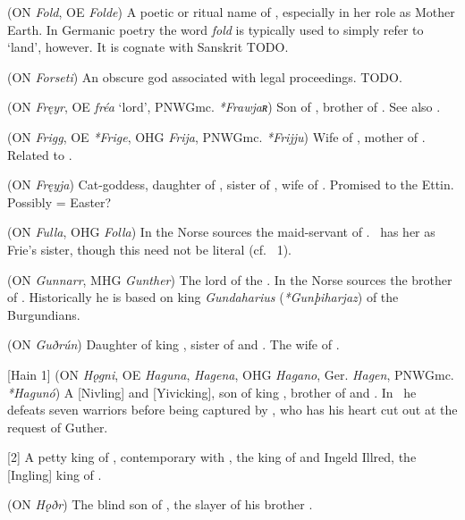 \begin{itemize}
 (ON \emph{Fold}, OE \emph{Folde})
  A poetic or ritual name of , especially in her role as Mother Earth.  In Germanic poetry the word \emph{fold} is typically used to simply refer to ‘land’, however.  It is cognate with Sanskrit TODO.

 (ON \emph{Forseti})
  An obscure god associated with legal proceedings. TODO.

 (ON \emph{Fręyr}, OE \emph{fréa} ‘lord’, PNWGmc. \emph{*Frawjaʀ})
  Son of , brother of . See also .

 (ON \emph{Frigg}, OE \emph{*Frige}, OHG \emph{Frija}, PNWGmc. \emph{*Frijju})
  Wife of , mother of . Related to .

 (ON \emph{Fręyja})
  Cat-goddess, daughter of , sister of , wife of . Promised to the Ettin. Possibly = Easter?

 (ON \emph{Fulla}, OHG \emph{Folla})
  In the Norse sources the maid-servant of .  \MerseburgTwo\ has her as Frie’s sister, though this need not be literal (cf. \Hyndluljod\ 1).

 (ON \emph{Gunnarr}, MHG \emph{Gunther})
  The lord of the .  In the Norse sources the brother of .  Historically he is based on king \emph{Gundaharius} (\emph{*Gunþiharjaz}) of the Burgundians.

 (ON \emph{Guðrún})
  Daughter of king , sister of  and . The wife of .

[Hain 1] (ON \emph{Hǫgni}, OE \emph{Haguna}, \emph{Hagena}, OHG \emph{Hagano}, Ger. \emph{Hagen}, PNWGmc. \emph{*Hagunó})
  A [Nivling] and [Yivicking], son of king , brother of  and . In \Atlakvida\ he defeats seven warriors before being captured by , who has his heart cut out at the request of Guther.

[2]
  A petty king of , contemporary with , the king of  and Ingeld Illred, the [Ingling] king of .

 (ON \emph{Hǫðr})
  The blind son of , the slayer of his brother .


\end{itemize}
